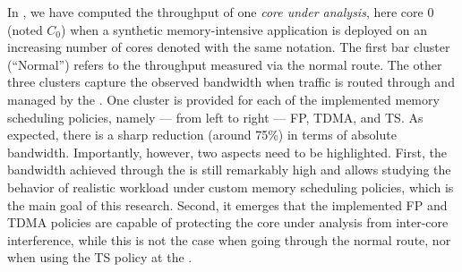 In , we have computed the throughput of
one \emph{core under analysis}, here core 0 (noted $C_{0}$) when a
synthetic memory-intensive application is deployed on an increasing
number of cores denoted with the same notation. The first bar cluster
(``Normal'') refers to the throughput measured via the normal
route. The other three clusters capture the observed bandwidth when
traffic is routed through and managed by the \schim. One cluster is
provided for each of the implemented memory scheduling policies,
namely --- from left to right --- FP, TDMA, and TS. As expected, there
is a sharp reduction (around 75\%) in terms of absolute
bandwidth. Importantly, however, two aspects need to be
highlighted. First, the bandwidth achieved through the \schim is still
remarkably high and allows studying the behavior of realistic workload
under custom memory scheduling policies, which is the main goal of
this research. Second, it emerges that the implemented FP and TDMA
policies are capable of protecting the core under analysis from
inter-core interference, while this is not the case when going through
the normal route, nor when using the TS policy at the \schim.




